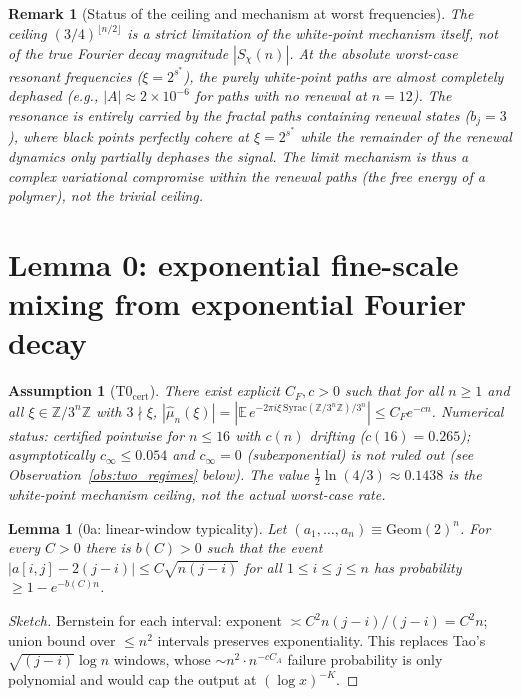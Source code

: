 \documentclass[12pt,a4paper]{article}
\newtheorem{lemma}[theorem]{Lemma}
\newtheorem{remark}[theorem]{Remark}
\newtheorem{assumption}[theorem]{Assumption}
\begin{document}
\begin{remark}[Status of the ceiling and mechanism at worst frequencies]
The ceiling $(3/4)^{\lfloor n/2\rfloor}$ is a strict limitation of the white-point mechanism itself, not of the true Fourier decay magnitude $|S_\chi(n)|$. At the absolute worst-case resonant frequencies ($\xi = 2^{s^*}$), the purely white-point paths are almost completely dephased (e.g., $|A| \approx 2 \times 10^{-6}$ for paths with no renewal at $n=12$). The resonance is entirely carried by the fractal paths containing renewal states ($b_j = 3$), where black points perfectly cohere at $\xi = 2^{s^*}$ while the remainder of the renewal dynamics only partially dephases the signal. The limit mechanism is thus a complex variational compromise within the renewal paths (the free energy of a polymer), not the trivial ceiling.
\end{remark}

\section*{Lemma 0: exponential fine-scale mixing from exponential Fourier decay}

\begin{assumption}[T0$_{\mathrm{cert}}$]
There exist explicit $C_F,c>0$ such that for all $n\ge1$ and all
$\xi\in\mathbb Z/3^n\mathbb Z$ with $3\nmid\xi$,
$|\hat\mu_n(\xi)|=|\mathbb E\,e^{-2\pi i\xi\,\mathrm{Syrac}(\mathbb Z/3^n\mathbb Z)/3^n}|
\le C_Fe^{-cn}$.
Numerical status: certified pointwise for $n\le16$ with $c(n)$ drifting ($c(16)=0.265$);
asymptotically $c_\infty \le 0.054$ and $c_\infty=0$ (subexponential) is not ruled out
(see Observation~\ref{obs:two_regimes} below). The value $\tfrac12\ln(4/3)\approx0.1438$ is the white-point
mechanism ceiling, not the actual worst-case rate.
\end{assumption}

\begin{lemma}[0a: linear-window typicality]
Let $(a_1,\dots,a_n)\equiv\mathrm{Geom}(2)^n$. For every $C>0$ there is
$b(C)>0$ such that the event
$|a[i,j]-2(j-i)|\le C\sqrt{n(j-i)}$ for all $1\le i\le j\le n$
has probability $\ge1-e^{-b(C)n}$.
\end{lemma}
\begin{proof}[Sketch] Bernstein for each interval: exponent
$\asymp C^2n(j-i)/(j-i)=C^2n$; union bound over $\le n^2$ intervals
preserves exponentiality. This replaces Tao's $\sqrt{(j-i)}\log n$ windows,
whose $\sim n^2\cdot n^{-cC_A}$ failure probability is only polynomial and
would cap the output at $(\log x)^{-K}$.
\end{proof}
\end{document}
